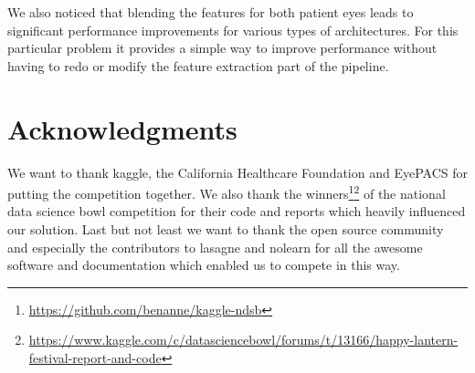 \documentclass[12pt,a4paper]{scrartcl}
\begin{document}
We also noticed that blending the features for both patient eyes leads to significant performance improvements for various types of architectures. For this particular problem it provides a simple way to improve performance without having to redo or modify the feature extraction part of the pipeline.
\section{Acknowledgments}
We want to thank kaggle, the California Healthcare Foundation and EyePACS for putting the competition together.
We also thank the winners\footnote{\url{https://github.com/benanne/kaggle-ndsb}}\footnote{\url{ https://www.kaggle.com/c/datasciencebowl/forums/t/13166/happy-lantern-festival-report-and-code}} of the national data science bowl competition for their code and reports which heavily influenced our solution.
Last but not least we want to thank the open source community and especially the contributors to lasagne and nolearn for all the awesome software and documentation which enabled us to compete in this way.
\end{document}
